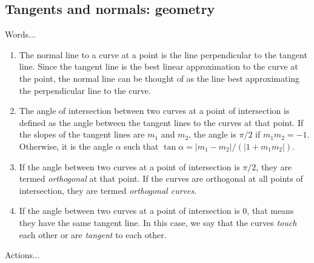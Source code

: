 \documentclass[10pt]{amsart}
\begin{document}
\subsection{Tangents and normals: geometry}

Words...

\begin{enumerate}
\item The normal line to a curve at a point is the line perpendicular
  to the tangent line. Since the tangent line is the best linear
  approximation to the curve at the point, the normal line can be
  thought of as the line best approximating the perpendicular line to
  the curve.
\item The angle of intersection between two curves at a point of
  intersection is defined as the angle between the tangent lines to
  the curves at that point. If the slopes of the tangent lines are
  $m_1$ and $m_2$, the angle is $\pi/2$ if $m_1m_2 = -1$. Otherwise,
  it is the angle $\alpha$ such that $\tan \alpha = |m_1 - m_2|/(|1 +
  m_1m_2|)$.
\item If the angle between two curves at a point of intersection is
  $\pi/2$, they are termed {\em orthogonal} at that point. If the
  curves are orthogonal at all points of intersection, they are termed
  {\em orthogonal curves}.
\item If the angle between two curves at a point of intersection is
  $0$, that means they have the same tangent line. In this case, we
  say that the curves {\em touch} each other or are {\em tangent} to
  each other.
\end{enumerate}

Actions...
\end{document}
